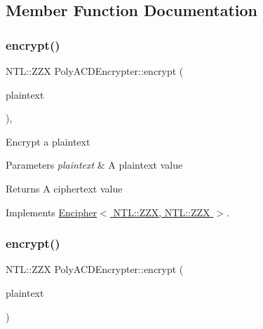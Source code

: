 \subsection{Member Function Documentation}
\mbox{\label{classPolyACDEncrypter_a5233a73398d39d93567392c64a120e1e}} 
\subsubsection{\texorpdfstring{encrypt()}{encrypt()}\hspace{0.1cm}{\footnotesize\ttfamily [1/2]}}
{\footnotesize\ttfamily N\+T\+L\+::\+Z\+ZX Poly\+A\+C\+D\+Encrypter\+::encrypt (\begin{DoxyParamCaption}\item[{N\+T\+L\+::\+Z\+ZX \&}]{plaintext }\end{DoxyParamCaption})\hspace{0.3cm}{\ttfamily [override]}, {\ttfamily [virtual]}}

Encrypt a plaintext 
\begin{DoxyParams}{Parameters}
{\em plaintext} & A plaintext value \\
\hline
\end{DoxyParams}
\begin{DoxyReturn}{Returns}
A ciphertext value 
\end{DoxyReturn}


Implements \hyperlink{classEncipher_aaf8138eb280608bfd03c6eb762ffc010}{Encipher$<$ N\+T\+L\+::\+Z\+Z\+X, N\+T\+L\+::\+Z\+Z\+X $>$}.

\mbox{\label{classPolyACDEncrypter_ae4de72005efe6dc0dca2d2b41a655b3a}} 
\subsubsection{\texorpdfstring{encrypt()}{encrypt()}\hspace{0.1cm}{\footnotesize\ttfamily [2/2]}}
{\footnotesize\ttfamily N\+T\+L\+::\+Z\+ZX Poly\+A\+C\+D\+Encrypter\+::encrypt (\begin{DoxyParamCaption}\item[{N\+T\+L\+::vec\+\_\+\+ZZ \&}]{plaintext }\end{DoxyParamCaption})}

